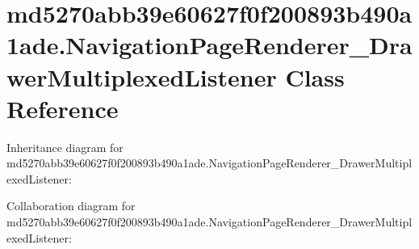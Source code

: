 \hypertarget{classmd5270abb39e60627f0f200893b490a1ade_1_1_navigation_page_renderer___drawer_multiplexed_listener}{}\section{md5270abb39e60627f0f200893b490a1ade.\+Navigation\+Page\+Renderer\+\_\+\+Drawer\+Multiplexed\+Listener Class Reference}
\label{classmd5270abb39e60627f0f200893b490a1ade_1_1_navigation_page_renderer___drawer_multiplexed_listener}


Inheritance diagram for md5270abb39e60627f0f200893b490a1ade.\+Navigation\+Page\+Renderer\+\_\+\+Drawer\+Multiplexed\+Listener\+:


Collaboration diagram for md5270abb39e60627f0f200893b490a1ade.\+Navigation\+Page\+Renderer\+\_\+\+Drawer\+Multiplexed\+Listener\+:

